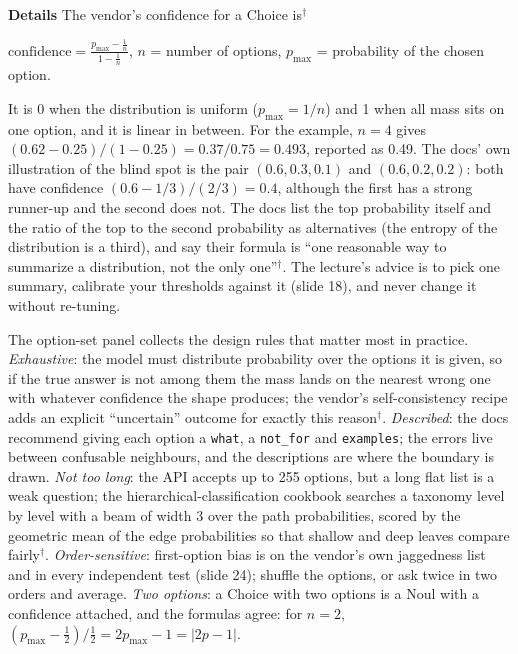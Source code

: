 \documentclass[11pt,letterpaper]{article}
\newcommand{\para}[1]{\medskip\noindent\textbf{#1}\quad}
\newenvironment{formulas}{\begin{tcolorbox}[formulabox]}{\end{tcolorbox}}
\newcommand{\pmax}{p_{\max}}
\begin{document}
\para{Details} The vendor's confidence for a Choice is$^\dagger$
\begin{formulas}
$\displaystyle \mathrm{confidence}=\frac{\pmax-\tfrac1n}{1-\tfrac1n}$, \qquad $n$ = number of options, $\pmax$ = probability of the chosen option.
\end{formulas}
It is 0 when the distribution is uniform ($\pmax=1/n$) and 1 when all mass sits on one option, and it is linear in between. For the example, $n=4$ gives $(0.62-0.25)/(1-0.25)=0.37/0.75=0.493$, reported as 0.49. The docs' own illustration of the blind spot is the pair $(0.6,0.3,0.1)$ and $(0.6,0.2,0.2)$: both have confidence $(0.6-1/3)/(2/3)=0.4$, although the first has a strong runner-up and the second does not. The docs list the top probability itself and the ratio of the top to the second probability as alternatives (the entropy of the distribution is a third), and say their formula is ``one reasonable way to summarize a distribution, not the only one''$^\dagger$. The lecture's advice is to pick one summary, calibrate your thresholds against it (slide 18), and never change it without re-tuning.

The option-set panel collects the design rules that matter most in practice. \emph{Exhaustive}: the model must distribute probability over the options it is given, so if the true answer is not among them the mass lands on the nearest wrong one with whatever confidence the shape produces; the vendor's self-consistency recipe adds an explicit ``uncertain'' outcome for exactly this reason$^\dagger$. \emph{Described}: the docs recommend giving each option a \texttt{what}, a \texttt{not\_for} and \texttt{examples}; the errors live between confusable neighbours, and the descriptions are where the boundary is drawn. \emph{Not too long}: the API accepts up to 255 options, but a long flat list is a weak question; the hierarchical-classification cookbook searches a taxonomy level by level with a beam of width 3 over the path probabilities, scored by the geometric mean of the edge probabilities so that shallow and deep leaves compare fairly$^\dagger$. \emph{Order-sensitive}: first-option bias is on the vendor's own jaggedness list and in every independent test (slide 24); shuffle the options, or ask twice in two orders and average. \emph{Two options}: a Choice with two options is a Noul with a confidence attached, and the formulas agree: for $n=2$, $(\pmax-\tfrac12)/\tfrac12=2\pmax-1=|2p-1|$.
\end{document}

